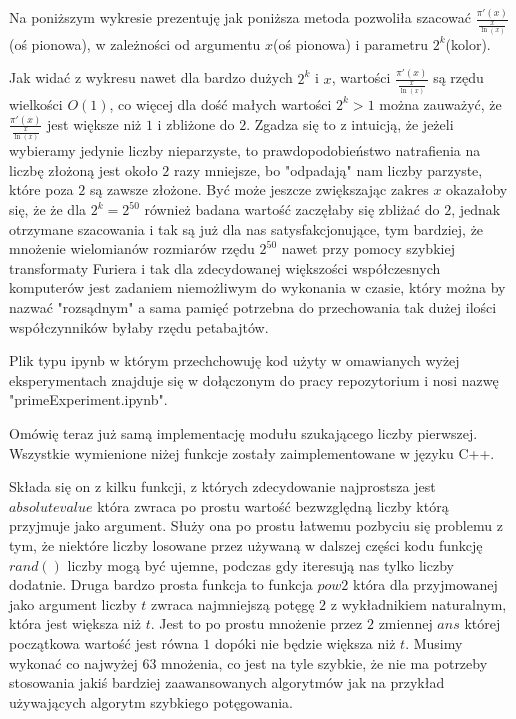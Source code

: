 \documentclass{article}
\begin{document}
Na poniższym wykresie prezentuję jak poniższa metoda pozwoliła szacować $\frac{\pi'(x)}{\frac{x}{\ln(x)}}$
(oś pionowa), w zależności od argumentu $x$(oś pionowa) i parametru $2^k$(kolor).



Jak widać z wykresu nawet dla bardzo dużych $2^k$ i $x$, wartości $\frac{\pi'(x)}{\frac{x}{\ln(x)}}$ są 
rzędu wielkości $O(1)$, co więcej dla dość małych wartości $2^k>1$ można zauważyć, że $\frac{\pi'(x)}{\frac{x}{\ln(x)}}$ jest 
większe niż $1$ i zbliżone do $2$. Zgadza się to z intuicją, że jeżeli wybieramy jedynie liczby nieparzyste,
to prawdopodobieństwo natrafienia na liczbę złożoną jest około $2$ razy mniejsze, bo "odpadają" nam 
liczby parzyste, które poza $2$ są zawsze złożone. Być może jeszcze zwiększając zakres $x$ okazałoby się, że 
że dla $2^k=2^{50}$ również badana wartość zaczęłaby się zbliżać do $2$, jednak otrzymane szacowania i tak
są już dla nas satysfakcjonujące, tym bardziej, że mnożenie wielomianów rozmiarów rzędu $2^{50}$ nawet przy pomocy
szybkiej transformaty Furiera i tak dla zdecydowanej większości współczesnych komputerów jest zadaniem niemożliwym
do wykonania w czasie, który można by nazwać "rozsądnym" a sama pamięć potrzebna do przechowania
tak dużej ilości współczynników byłaby rzędu petabajtów. 

Plik typu ipynb w którym przechchowuję kod użyty w omawianych wyżej eksperymentach znajduje się
w dołączonym do pracy repozytorium i nosi nazwę "primeExperiment.ipynb".


Omówię teraz już samą implementację modułu szukającego liczby pierwszej. Wszystkie wymienione niżej funkcje zostały 
zaimplementowane w języku C++.

Składa się on z kilku funkcji, z których zdecydowanie najprostsza jest $absolutevalue$ która
zwraca po prostu wartość bezwzględną liczby którą przyjmuje jako argument. Służy ona po prostu
łatwemu pozbyciu się problemu z tym, że niektóre liczby losowane przez używaną w dalszej
części kodu funkcję $rand()$ liczby mogą być ujemne, podczas gdy iteresują nas tylko liczby dodatnie. 
Druga bardzo prosta funkcja to funkcja $pow2$ która dla przyjmowanej jako argument liczby $t$ 
zwraca najmniejszą potęgę $2$ z wykładnikiem naturalnym, która jest większa niż $t$. Jest to po prostu
mnożenie przez $2$ zmiennej $ans$ której początkowa wartość jest równa $1$ dopóki nie będzie 
większa niż $t$. Musimy wykonać co najwyżej $63$ mnożenia, co jest na tyle szybkie, że nie ma 
potrzeby stosowania jakiś bardziej zaawansowanych algorytmów jak na przykład 
używających algorytm szybkiego potęgowania.
\end{document}
